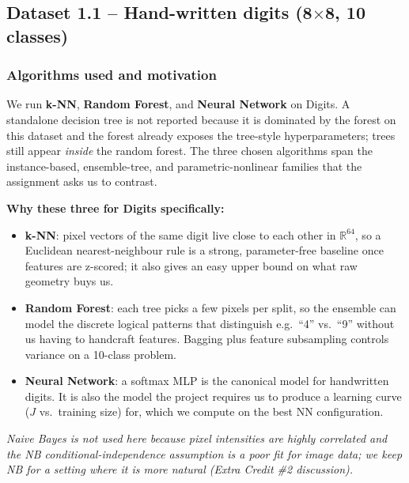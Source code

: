 \documentclass[11pt]{article}
\begin{document}
\subsection{Dataset 1.1 -- Hand-written digits (8$\times$8, 10 classes)}

\subsubsection{Algorithms used and motivation}
We run \textbf{k-NN}, \textbf{Random Forest}, and \textbf{Neural Network} on Digits. A standalone decision tree is not reported because it is dominated by the forest on this dataset and the forest already exposes the tree-style hyperparameters; trees still appear \emph{inside} the random forest. The three chosen algorithms span the instance-based, ensemble-tree, and parametric-nonlinear families that the assignment asks us to contrast.
\newline

\textbf{Why these three for Digits specifically:}
\begin{itemize}
  \item \textbf{k-NN}: pixel vectors of the same digit live close to each other in $\mathbb{R}^{64}$, so a Euclidean nearest-neighbour rule is a strong, parameter-free baseline once features are z-scored; it also gives an easy upper bound on what raw geometry buys us.
  \item \textbf{Random Forest}: each tree picks a few pixels per split, so the ensemble can model the discrete logical patterns that distinguish e.g.\ ``4'' vs.\ ``9'' without us having to handcraft features. Bagging plus feature subsampling controls variance on a 10-class problem.
  \item \textbf{Neural Network}: a softmax MLP is the canonical model for handwritten digits. It is also the model the project requires us to produce a learning curve ($J$ vs.\ training size) for, which we compute on the best NN configuration.
\end{itemize}
\emph{Naive Bayes is not used here because pixel intensities are highly correlated and the NB conditional-independence assumption is a poor fit for image data; we keep NB for a setting where it is more natural (Extra Credit \#2 discussion).}
\end{document}
